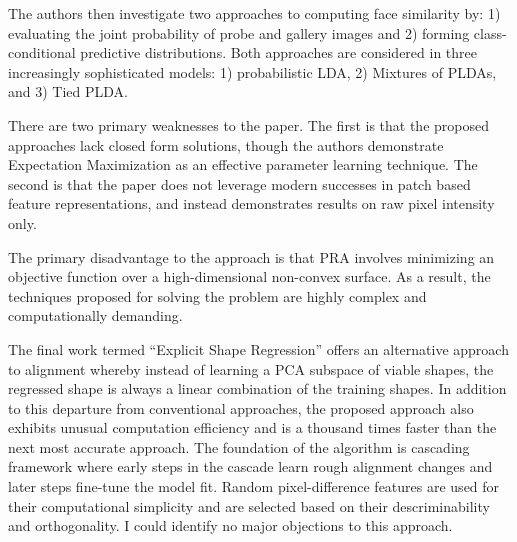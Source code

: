 \documentclass[12pt]{article}
\begin{document}
The authors then investigate two approaches to computing face similarity by: 1) evaluating the joint probability of probe and gallery images and 2) forming class-conditional predictive distributions.
Both approaches are considered in three increasingly sophisticated models: 1) probabilistic LDA, 2) Mixtures of PLDAs, and 3) Tied PLDA.
\par
There are two primary weaknesses to the paper.
The first is that the proposed approaches lack closed form solutions, though the authors demonstrate Expectation Maximization as an effective parameter learning technique.
The second is that the paper does not leverage modern successes in patch based feature representations, and instead demonstrates results on raw pixel intensity only.
\par
The primary disadvantage to the approach is that PRA involves minimizing an objective function over a high-dimensional non-convex surface.
As a result, the techniques proposed for solving the problem are highly complex and computationally demanding.
\par
The final work termed ``Explicit Shape Regression'' offers an alternative approach to alignment whereby instead of learning a PCA subspace of viable shapes, the regressed shape is always a linear combination of the training shapes.
In addition to this departure from conventional approaches, the proposed approach also exhibits unusual computation efficiency and is a thousand times faster than the next most accurate approach.
The foundation of the algorithm is cascading framework where early steps in the cascade learn rough alignment changes and later steps fine-tune the model fit.
Random pixel-difference features are used for their computational simplicity and are selected based on their descriminability and orthogonality.
I could identify no major objections to this approach.
 
\end{document}
